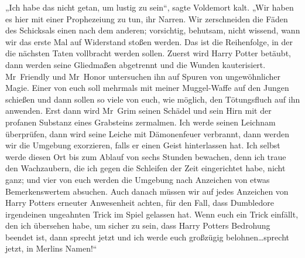 „Ich habe das nicht getan, um lustig zu sein“, sagte Voldemort kalt.
„Wir haben es hier mit einer Prophezeiung zu tun, ihr Narren. Wir zerschneiden die Fäden des Schicksals einen nach dem anderen; vorsichtig, behutsam, nicht wissend, wann wir das erste Mal auf Widerstand stoßen werden. Das ist die Reihenfolge, in der die nächsten Taten vollbracht werden sollen. Zuerst wird Harry Potter betäubt, dann werden seine Gliedmaßen abgetrennt und die Wunden kauterisiert. Mr~Friendly und Mr~Honor untersuchen ihn auf Spuren von ungewöhnlicher Magie. Einer von euch soll mehrmals mit meiner Muggel-Waffe auf den Jungen schießen und dann sollen so viele von euch, wie möglich, den Tötungsfluch auf ihn anwenden. Erst dann wird Mr~Grim seinen Schädel und sein Hirn mit der profanen Substanz eines Grabsteins zermalmen. Ich werde seinen Leichnam überprüfen, dann wird seine Leiche mit Dämonenfeuer verbrannt, dann werden wir die Umgebung exorzieren, falls er einen Geist hinterlassen hat. Ich selbst werde diesen Ort bis zum Ablauf von sechs Stunden bewachen, denn ich traue den Wachzaubern, die ich gegen die Schleifen der Zeit eingerichtet habe, nicht ganz; und vier von euch werden die Umgebung nach Anzeichen von etwas Bemerkenswertem absuchen. Auch danach müssen wir auf jedes Anzeichen von Harry Potters erneuter Anwesenheit achten, für den Fall, dass Dumbledore irgendeinen ungeahnten Trick im Spiel gelassen hat. Wenn euch ein Trick einfällt, den ich übersehen habe, um sicher zu sein, dass Harry Potters Bedrohung beendet ist, dann sprecht jetzt und ich werde euch großzügig belohnen…sprecht jetzt, in Merlins Namen!“

